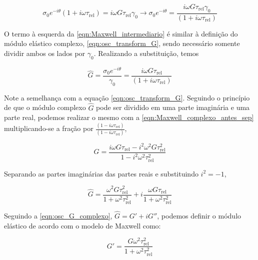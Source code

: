			\begin{equation}
				\sigma_0e^{-i\theta} \left(   1 + i\omega\tau_{\textrm{rel}}  \right) = i\omega G\tau_{\textrm{rel}}\gamma_0 \to
				\sigma_0e^{-i\theta} = \dfrac{i\omega G\tau_{\textrm{rel}}\gamma_0}{\left(   1 + i\omega\tau_{\textrm{rel}}  \right)}
				\label{eqn:Maxwell_intermediario}
			\end{equation}
			
			O termo à esquerda da \autoref{eqn:Maxwell_intermediario} é similar à definição do módulo elástico complexo, \autoref{eqn:osc_transform_G}, sendo necessário somente dividir ambos os lados por \(\gamma_0\). Realizando a substituição, temos
			
			\begin{equation}
				\hat{G} = \dfrac{\sigma_0e^{-i\theta}}{\gamma_0} = \dfrac{i\omega G\tau_{\textrm{rel}}}{\left(   1 + i\omega\tau_{\textrm{rel}}  \right)}
				\label{eqn:Maxwell_complexo_antes_sep}
			\end{equation}
			
			Note a semelhança com a equação \ref{eqn:osc_transform_G}. Seguindo o princípio de que o módulo complexo \(\hat{G}\) pode ser dividido em uma parte imaginária e uma parte real, podemos realizar o mesmo com a \autoref{eqn:Maxwell_complexo_antes_sep} multiplicando-se a fração por \(\frac{\left(   1 - i\omega\tau_{\mathrm{rel}}  \right)}{\left(   1 - i\omega\tau_{\mathrm{rel}}  \right)}\),
			
			\begin{equation}
				\hat{G} = \dfrac{  i\omega G\tau_{\textrm{rel}} - i^2 \omega^2 G \tau_{\textrm{rel}}^2        }{  1 - i^2\omega^2 \tau_{\textrm{rel}}^2          }
				\label{eqn:Maxwell_complexo_antes_sep2}
			\end{equation}
			
			Separando as partes imaginárias das partes reais e substituindo \(i^2 = -1\),
			
			\begin{equation}
				\hat{G} = \dfrac{   \omega^2 G \tau_{\textrm{rel}}^2       }{  1 + \omega^2 \tau_{\textrm{rel}}^2      } + i \dfrac{   \omega G \tau_{\textrm{rel}}        }{ 1 + \omega^2 \tau_{\textrm{rel}}^2 }
				\label{eqn:Maxwell_substituido}
			\end{equation}
			
			Seguindo a \autoref{eqn:osc_G_complexo}, \(\hat{G} = G' + iG''\), podemos definir o módulo elástico de acordo com o modelo de Maxwell como:
			
			\begin{equation}
				G' = \dfrac{ G \omega^2 \tau_{\textrm{rel}}^2   }{  1 + \omega^2 \tau_{\textrm{rel}}^2      }
				\label{eqn:Maxwell_G1_def}
			\end{equation} 
			
